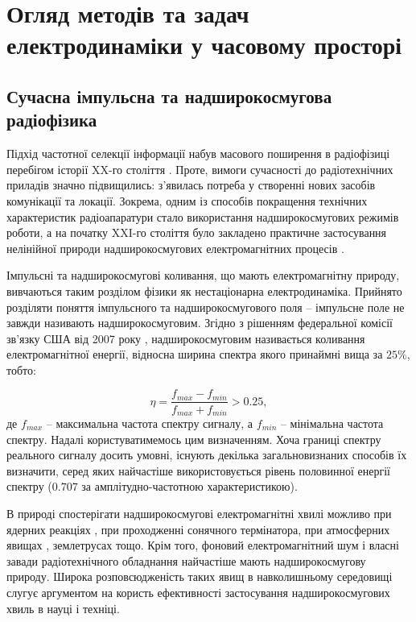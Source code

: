 \chapter{Огляд методів та задач електродинаміки у часовому просторі}
\label{ch:review}

\section{Сучасна імпульсна та надширокосмугова радіофізика}

Підхід частотної селекції інформації набув масового поширення в радіофізиці
перебігом історії XX-го століття \cite{imp:Nosich2001}. Проте, вимоги 
сучасності до радіотехнічних приладів значно підвищились: з'явилась потреба 
у створенні нових засобів комунікації та локації. Зокрема, одним із 
способів покращення технічних характеристик радіоапаратури стало 
використання надширокосмугових режимів роботи, а на початку XXI-го 
століття було закладено практичне застосування нелінійної природи 
надширокосмугових електромагнітних процесів \cite{imp:Chernogor2008}.

Імпульсні та надширокосмугові коливання, що мають електромагнітну природу, 
вивчаються таким розділом фізики як нестаціонарна електродинаміка. Прийнято 
розділяти поняття імпульсного та надширокосмугового поля -- імпульсне поле 
не завжди називають надширокосмуговим. Згідно з рішенням федеральної 
комісії зв'язку США від 2007 року \cite{imp:RadarStandard2007}, 
надширокосмуговим називається коливання електромагнітної енергії, 
відносна ширина спектра якого принаймні вища за $ 25\% $, тобто:

\begin{equation} \label{eq:spectum_width}
\eta = \frac{f_{max} - f_{min}}{f_{max} + f_{min}} > 0.25,
\end{equation}
%
де $ f_{max} $ -- максимальна частота спектру сигналу, а $ f_{min} $ -- 
мінімальна частота спектру. Надалі користуватимемось цим визначенням. 
Хоча границі спектру реального сигналу досить умовні, існують декілька 
загальновизнаних способів їх визначити, серед яких найчастіше 
використовується рівень половинної енергії спектру ($ 0.707 $ за 
амплітудно-частотною характеристикою).

В природі спостерігати надширокосмугові електромагнітні хвилі можливо при 
ядерних реакціях \cite{imp:Baum2007}, при проходженні сонячного термінатора, 
при атмосферних явищах \cite{imp:Uman2006}, землетрусах 
\cite{imp:Hayakawa2008} тощо. Крім того, фоновий електромагнітний шум і 
власні завади радіотехнічного обладнання найчастіше мають 
надширокосмугову природу. Широка розповсюдженість таких явищ в 
навколишньому середовищі слугує аргументом на користь ефективності 
застосування надширокосмугових хвиль в науці і техніці.

